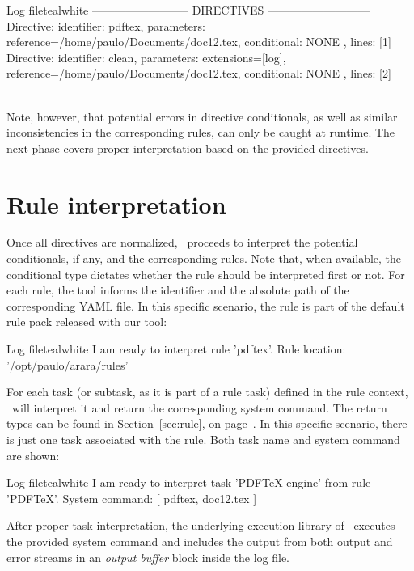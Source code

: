 \begin{codebox}{Log file}{teal}{\icnote}{white}
-------------------------- DIRECTIVES ---------------------------
Directive: { identifier: pdftex, parameters:
{reference=/home/paulo/Documents/doc12.tex},
conditional: { NONE }, lines: [1] }
Directive: { identifier: clean, parameters: {extensions=[log],
reference=/home/paulo/Documents/doc12.tex},
conditional: { NONE }, lines: [2] }
-----------------------------------------------------------------
\end{codebox}

Note, however, that potential errors in directive conditionals, as well as similar inconsistencies in the corresponding rules, can only be caught at runtime. The next phase covers proper interpretation based on the provided directives.

\section{Rule interpretation}
\label{sec:ruleinterpretation}

Once all directives are normalized, \arara\ proceeds to interpret the potential conditionals, if any, and the corresponding rules. Note that, when available, the conditional type dictates whether the rule should be interpreted first or not. For each rule, the tool informs the identifier and the absolute path of the corresponding YAML file. In this specific scenario, the rule is part of the default rule pack released with our tool:

\begin{codebox}{Log file}{teal}{\icnote}{white}
I am ready to interpret rule 'pdftex'.
Rule location: '/opt/paulo/arara/rules'
\end{codebox}

For each task (or subtask, as it is part of a rule task) defined in the rule context, \arara\ will interpret it and return the corresponding system command. The return types can be found in Section~\ref{sec:rule}, on page~\pageref{sec:rule}. In this specific scenario, there is just one task associated with the  rule. Both task name and system command are shown:

\begin{codebox}{Log file}{teal}{\icnote}{white}
I am ready to interpret task 'PDFTeX engine' from rule 'PDFTeX'.
System command: [ pdftex, doc12.tex ]
\end{codebox}

After proper task interpretation, the underlying execution library of \arara\ executes the provided system command and includes the output from both output and error streams in an \emph{output buffer} block inside the log file.

